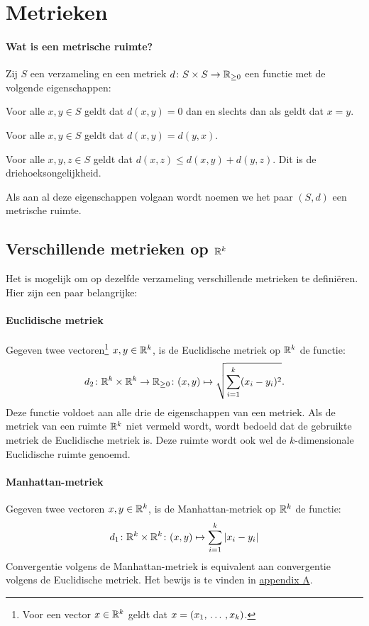 \section{Metrieken}

\paragraph{Wat is een metrische ruimte?} Zij \(S\) een verzameling en een metriek \(d\colon S\times S\to \mathbb{R}_{\geq0}\) een functie met de volgende eigenschappen:
\begin{enum}[i.]
    \item Voor alle \(x,y\in S\) geldt dat \(d(x,y)=0\) dan en slechts dan als geldt dat \(x=y\).
    \item Voor alle \(x,y\in S\) geldt dat \(d(x,y)=d(y,x)\).
    \item Voor alle \(x,y,z\in S\) geldt dat \(d(x,z)\leq d(x,y)+d(y,z)\). Dit is de driehoeksongelijkheid.
\end{enum}
Als aan al deze eigenschappen volgaan wordt noemen we het paar \((S,d)\) een metrische ruimte.

\subsection{Verschillende metrieken op \texorpdfstring{\(\mathbb{R}^{k}\)}{rk}}
Het is mogelijk om op dezelfde verzameling verschillende metrieken te definiëren. Hier zijn een paar belangrijke:

\paragraph{Euclidische metriek} Gegeven twee vectoren\footnote{Voor een vector \(x\in\mathbb{R}^{k}\) geldt dat \(x=(x_{1},\,\dots\,,x_{k})\).} \(x,y\in\mathbb{R}^{k}\), is de Euclidische metriek op \(\mathbb{R}^{k}\) de functie:
\[
    d_{2}\colon\mathbb{R}^{k}\times\mathbb{R}^{k}\to\mathbb{R}_{\geq0}\colon(x,y)\mapsto\sqrt{\sum\limits_{i=1}^{k}(x_{i}-y_{i})^{2}}.
\]
Deze functie voldoet aan alle drie de eigenschappen van een metriek. Als de metriek van een ruimte \(\mathbb{R}^{k}\) niet vermeld wordt, wordt bedoeld dat de gebruikte metriek de Euclidische metriek is. Deze ruimte wordt ook wel de \(k\)-dimensionale Euclidische ruimte genoemd.

\paragraph{Manhattan-metriek} Gegeven twee vectoren \(x,y\in\mathbb{R}^{k}\), is de Manhattan-metriek op \(\mathbb{R}^{k}\) de functie:
\[
    d_{1}\colon\mathbb{R}^{k}\times\mathbb{R}^{k}\colon(x,y)\mapsto\sum\limits_{i=1}^{k}|x_{i}-y_{i}|
\]
Convergentie volgens de Manhattan-metriek is equivalent aan convergentie volgens de Euclidische metriek. Het bewijs is te vinden in \hyperref[sec:eqeucman]{appendix A}.

